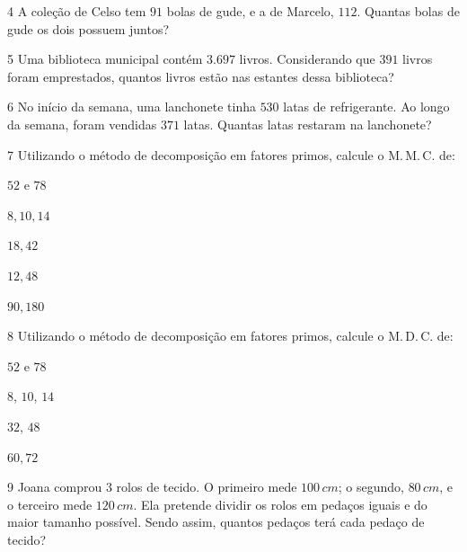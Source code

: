 
\num{4}  A coleção de Celso tem $91$ bolas de gude, e a de Marcelo, $112$. Quantas
bolas de gude os dois possuem juntos?



\num{5}  Uma biblioteca municipal contém $3.697$ livros. Considerando que $391$
livros foram emprestados, quantos livros estão nas estantes dessa
biblioteca?


\num{6}  No início da semana, uma lanchonete tinha $530$ latas de refrigerante.
Ao longo da semana, foram vendidas $371$ latas. Quantas latas restaram na
lanchonete?


\num{7}  Utilizando o método de decomposição em fatores primos, calcule o
M.\,M.\,C. de:

\begin{escolha}
\item $52$ e $78$ 
\item $8,10,14$ 
\item $18,42$ 
\item $12,48$ 
\item $90,180$ 
\end{escolha}

\num{8}  Utilizando o método de decomposição em fatores primos, calcule o
M.\,D.\,C. de:

\begin{escolha}
\item $52$ e $78$ 
\item $8$, $10$, $14$ 
\item $32$, $48$ 
\item $60,72$ 
\end{escolha}

\num{9} Joana comprou $3$ rolos de tecido. O primeiro mede $100\,cm$; o segundo,
$80\,cm$, e o terceiro mede $120\,cm$. Ela pretende dividir os rolos em
pedaços iguais e do maior tamanho possível. Sendo assim, quantos pedaços
terá cada pedaço de tecido?

